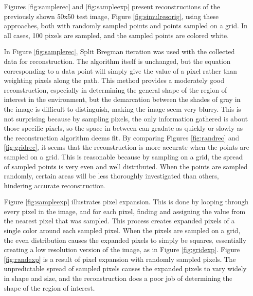 \documentclass[english]{article}\usepackage[]{graphicx}\usepackage[]{color}
\begin{document}
Figures \ref{fig:samplerec} and \ref{fig:sampleexp} present reconstructions of the previously shown 50x50 test image, Figure \ref{fig:simulresorig}, using these approaches, both with randomly sampled points and points sampled on a grid. In all cases, 100 pixels are sampled, and the sampled points are colored white.

In Figure \ref{fig:samplerec}, Split Bregman iteration was used with the collected data for reconstruction. The algorithm itself is unchanged, but the equation corresponding to a data point will simply give the value of a pixel rather than weighting pixels along the path. This method provides a moderately good reconstruction, especially in determining the general shape of the region of interest in the environment, but the demarcation between the shades of gray in the image is difficult to distinguish, making the image seem very blurry. This is not surprising because by sampling pixels, the only information gathered is about those specific pixels, so the space in between can gradate as quickly or slowly as the reconstruction algorithm deems fit. By comparing Figures \ref{fig:randrec} and \ref{fig:gridrec}, it seems that the reconstruction is more accurate when the points are sampled on a grid. This is reasonable because by sampling on a grid, the spread of sampled points is very even and well distributed. When the points are sampled randomly, certain areas will be less thoroughly investigated than others, hindering accurate reconstruction.

Figure \ref{fig:sampleexp} illustrates pixel expansion. This is done by looping through every pixel in the image, and for each pixel, finding and assigning the value from the nearest pixel that was sampled. This process creates expanded pixels of a single color around each sampled pixel. When the pixels are sampled on a grid, the even distribution causes the expanded pixels to simply be squares, essentially creating a low resolution version of the image, as in Figure \ref{fig:gridexp}. Figure \ref{fig:randexp} is a result of pixel expansion with randomly sampled pixels. The unpredictable spread of sampled pixels causes the expanded pixels to vary widely in shape and size, and the reconstruction does a poor job of determining the shape of the region of interest.
\end{document}
